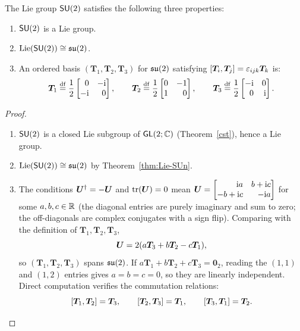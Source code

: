 \documentclass[11pt,reqno]{amsart}
\DeclareMathOperator{\Lie}{Lie}
\newcommand{\ii}{\mathrm{i}}
\begin{document}
\begin{Thm}\label{thm:SU2-properties}
The Lie group $\operatorname{\mathsf{SU}}(2)$ satisfies the following three properties:
\begin{enumerate}
\item $\operatorname{\mathsf{SU}}(2)$ is a Lie group.
\item $\Lie\Br{\SU(2)}\cong\su(2)$.
\item An ordered basis $(\bm T_1,\bm T_2,\bm T_3)$ for $\mathfrak{su}(2)$ satisfying
$\SqBr{\bm T_i,\bm T_j}=\eps_{ijk}\bm T_k$ is:
\[
\bm T_1\df\frac{1}{2}\mqty{0&-\ii\\ -\ii&0},\qquad
\bm T_2\df\frac{1}{2}\mqty{0&-1\\ 1&0},\qquad
\bm T_3\df\frac{1}{2}\mqty{-\ii&0\\ 0&\ii}.
\]
\end{enumerate}
\end{Thm}
\begin{proof}
\begin{enumerate}
\item $\operatorname{\mathsf{SU}}(2)$ is a closed Lie subgroup of $\operatorname{\mathsf{GL}}(2;\mathbb{C})$
(Theorem~\ref{cst}), hence a Lie group.

\item $\Lie\Br{\SU(2)}\cong\su(2)$ by Theorem~\ref{thm:Lie-SUn}.


\item The conditions $\bm U^{\dagger}=-\bm U$ and $\operatorname{tr}(\bm U)=0$ mean
$\bm U=\mqty{\ii a&b+\ii c\\ -b+\ii c&-\ii a}$
for some $a,b,c\in\mathbb{R}$ (the diagonal entries are purely imaginary and sum to zero;
the off-diagonals are complex conjugates with a sign flip).
Comparing with the definition of $\bm T_1,\bm T_2,\bm T_3$,
\[
\bm U=2\Br{a\bm T_3+b\bm T_2-c\bm T_1},
\]
so $(\bm T_1,\bm T_2,\bm T_3)$ spans $\mathfrak{su}(2)$.
If $a\bm T_1+b\bm T_2+c\bm T_3=\bm0_2$, reading the $(1,1)$ and $(1,2)$
entries gives $a=b=c=0$, so they are linearly independent.
Direct computation verifies the commutation relations:
\[
\SqBr{\bm T_1,\bm T_2}=\bm T_3,\qquad
\SqBr{\bm T_2,\bm T_3}=\bm T_1,\qquad
\SqBr{\bm T_3,\bm T_1}=\bm T_2.
\]
\end{enumerate}
\end{proof}
\end{document}
